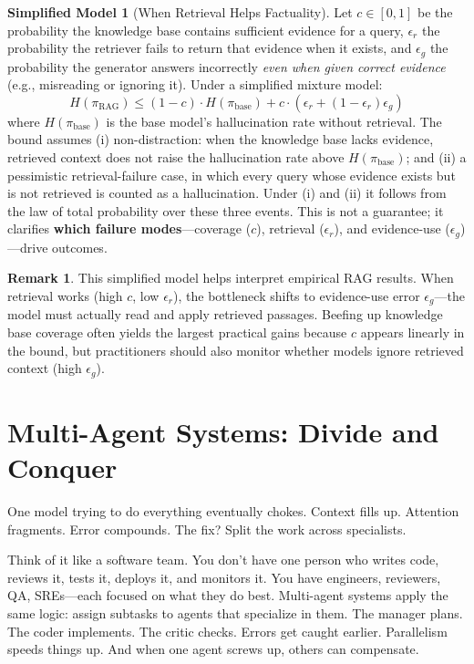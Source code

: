 \documentclass[12pt,a4paper]{report}
\theoremstyle{definition}
\newtheorem{remark}[theorem]{Remark}
\newtheorem{toymodel}[theorem]{Simplified Model}
\begin{document}
\begin{toymodel}[When Retrieval Helps Factuality]
\label{prop:hallucination}
Let $c \in [0,1]$ be the probability the knowledge base contains sufficient evidence for a query, $\epsilon_r$ the probability the retriever fails to return that evidence when it exists, and $\epsilon_g$ the probability the generator answers incorrectly \emph{even when given correct evidence} (e.g., misreading or ignoring it). Under a simplified mixture model:
\begin{equation}
H(\pi_{\text{RAG}}) \leq (1 - c) \cdot H(\pi_{\text{base}}) + c \cdot \left(\epsilon_r + (1-\epsilon_r)\epsilon_g\right)
\end{equation}
where $H(\pi_{\text{base}})$ is the base model's hallucination rate without retrieval. The bound assumes (i) non-distraction: when the knowledge base lacks evidence, retrieved context does not raise the hallucination rate above $H(\pi_{\text{base}})$; and (ii) a pessimistic retrieval-failure case, in which every query whose evidence exists but is not retrieved is counted as a hallucination. Under (i) and (ii) it follows from the law of total probability over these three events. This is not a guarantee; it clarifies \textbf{which failure modes}---coverage ($c$), retrieval ($\epsilon_r$), and evidence-use ($\epsilon_g$)---drive outcomes.
\end{toymodel}

\begin{remark}
This simplified model helps interpret empirical RAG results. When retrieval works (high $c$, low $\epsilon_r$), the bottleneck shifts to evidence-use error $\epsilon_g$---the model must actually read and apply retrieved passages. Beefing up knowledge base coverage often yields the largest practical gains because $c$ appears linearly in the bound, but practitioners should also monitor whether models ignore retrieved context (high $\epsilon_g$).
\end{remark}

\section{Multi-Agent Systems: Divide and Conquer}
One model trying to do everything eventually chokes. Context fills up. Attention fragments. Error compounds. The fix? Split the work across specialists.

Think of it like a software team. You don't have one person who writes code, reviews it, tests it, deploys it, and monitors it. You have engineers, reviewers, QA, SREs---each focused on what they do best. Multi-agent systems apply the same logic: assign subtasks to agents that specialize in them. The manager plans. The coder implements. The critic checks. Errors get caught earlier. Parallelism speeds things up. And when one agent screws up, others can compensate.
\end{document}
